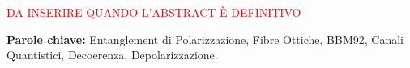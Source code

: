 \textcolor{red}{DA INSERIRE QUANDO L'ABSTRACT È DEFINITIVO}

\medskip

\noindent
\textbf{Parole chiave:}
Entanglement di Polarizzazione,
Fibre Ottiche,
BBM92,
Canali Quantistici,
Decoerenza,
Depolarizzazione.